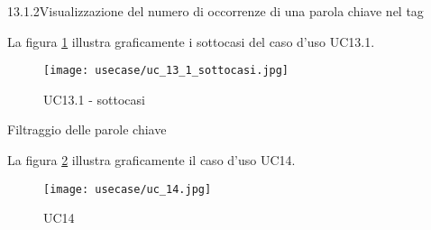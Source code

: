 \begin{usecase}{13.1.2}{Visualizzazione del numero di occorrenze di una parola chiave nel tag}\label{UC13point1point2}
\end{usecase}

\vspace{10pt}
\noindent
\begin{minipage}{\textwidth}
    La figura \ref{fig:uc13_1_sottocasi} illustra graficamente i sottocasi del caso d'uso UC13.1.
    \begin{figure}[H]
        \centering
        \texttt{[image: usecase/uc\_13\_1\_sottocasi.jpg]}
        \caption{UC13.1 - sottocasi}
        \label{fig:uc13_1_sottocasi}
    \end{figure}
\end{minipage}

\begin{usecase}{14}{Filtraggio delle parole chiave}\label{UC14}
\end{usecase}

\vspace{10pt}
\noindent
\begin{minipage}{\textwidth}
    La figura \ref{fig:uc14} illustra graficamente il caso d'uso UC14.
    \begin{figure}[H]
    \centering
    \texttt{[image: usecase/uc\_14.jpg]}
    \caption{UC14}
    \label{fig:uc14}
    \end{figure}
\end{minipage}

